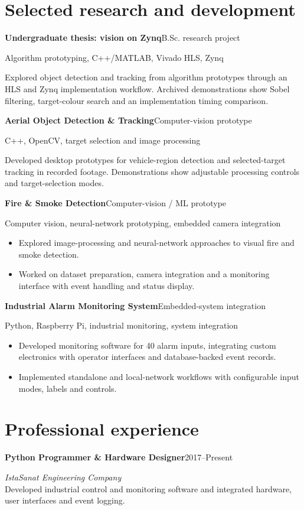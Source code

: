 \documentclass[11pt,a4paper]{article}
\newcommand{\entry}[2]{\textbf{#1}\hfill{\small\color{muted}#2}\par}
\newcommand{\tech}[1]{{\small\color{muted}#1}\par}
\begin{document}
\section*{Selected research and development}
\entry{Undergraduate thesis: vision on Zynq}{B.Sc. research project}
\tech{Algorithm prototyping, C++/MATLAB, Vivado HLS, Zynq}
Explored object detection and tracking from algorithm prototypes through an HLS and Zynq implementation workflow. Archived demonstrations show Sobel filtering, target-colour search and an implementation timing comparison.

\newpage
\entry{Aerial Object Detection \& Tracking}{Computer-vision prototype}
\tech{C++, OpenCV, target selection and image processing}
Developed desktop prototypes for vehicle-region detection and selected-target tracking in recorded footage. Demonstrations show adjustable processing controls and target-selection modes.\par

\entry{Fire \& Smoke Detection}{Computer-vision / ML prototype}
\tech{Computer vision, neural-network prototyping, embedded camera integration}
\begin{itemize}
  \item Explored image-processing and neural-network approaches to visual fire and smoke detection.
  \item Worked on dataset preparation, camera integration and a monitoring interface with event handling and status display.
\end{itemize}

\entry{Industrial Alarm Monitoring System}{Embedded-system integration}
\tech{Python, Raspberry Pi, industrial monitoring, system integration}
\begin{itemize}
  \item Developed monitoring software for 40 alarm inputs, integrating custom electronics with operator interfaces and database-backed event records.
  \item Implemented standalone and local-network workflows with configurable input modes, labels and controls.
\end{itemize}

\section*{Professional experience}
\entry{Python Programmer \& Hardware Designer}{2017--Present}
\textit{IstaSanat Engineering Company}\\
Developed industrial control and monitoring software and integrated hardware, user interfaces and event logging.
\end{document}
